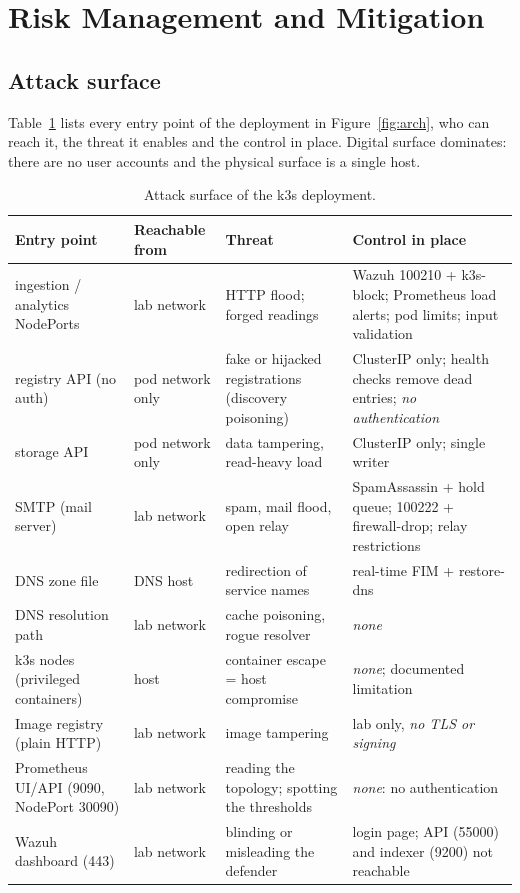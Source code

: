 \section{Risk Management and Mitigation}
\label{sec:risk}

\subsection{Attack surface}

Table~\ref{tab:surface} lists every entry point of the deployment in Figure~\ref{fig:arch}, who can
reach it, the threat it enables and the control in place. Digital surface dominates: there are no
user accounts and the physical surface is a single host.

\begin{table}[ht]
\centering\small
\caption{Attack surface of the k3s deployment.}
\label{tab:surface}
\begin{tabularx}{\textwidth}{@{}>{\raggedright}p{3.3cm} >{\raggedright}p{2.1cm} >{\raggedright}X >{\raggedright\arraybackslash}X@{}}
\toprule
Entry point & Reachable from & Threat & Control in place \\
\midrule
ingestion / analytics NodePorts & lab network & HTTP flood; forged readings & Wazuh 100210 + k3s-block; Prometheus load alerts; pod limits; input validation \\
registry API (no auth) & pod network only & fake or hijacked registrations (discovery poisoning) & ClusterIP only; health checks remove dead entries; \emph{no authentication} \\
storage API & pod network only & data tampering, read-heavy load & ClusterIP only; single writer \\
SMTP (mail server) & lab network & spam, mail flood, open relay & SpamAssassin + hold queue; 100222 + firewall-drop; relay restrictions \\
DNS zone file & DNS host & redirection of service names & real-time FIM + restore-dns \\
DNS resolution path & lab network & cache poisoning, rogue resolver & \emph{none} \\
k3s nodes (privileged containers) & host & container escape = host compromise & \emph{none}; documented limitation \\
Image registry (plain HTTP) & lab network & image tampering & lab only, \emph{no TLS or signing} \\
Prometheus UI/API (9090, NodePort 30090) & lab network & reading the topology; spotting the thresholds & \emph{none}: no authentication \\
Wazuh dashboard (443) & lab network & blinding or misleading the defender & login page; API (55000) and indexer (9200) not reachable \\
\bottomrule
\end{tabularx}
\end{table}

